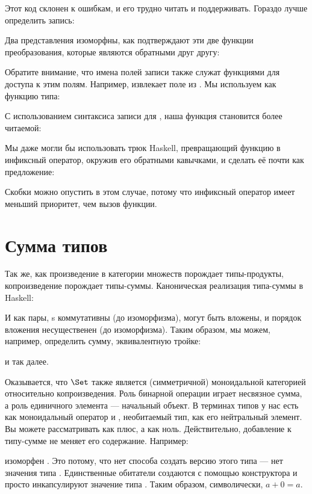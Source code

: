 Этот код склонен к ошибкам, и его трудно читать и поддерживать. Гораздо лучше определить запись:

Два представления изоморфны, как подтверждают эти две функции преобразования, которые являются обратными друг другу:


Обратите внимание, что имена полей записи также служат функциями для доступа к этим полям. Например,  извлекает поле  из . Мы используем  как функцию типа:

С использованием синтаксиса записи для , наша функция  становится более читаемой:

Мы даже могли бы использовать трюк Haskell, превращающий функцию  в инфиксный оператор, окружив его обратными кавычками, и сделать её почти как предложение:

Скобки можно опустить в этом случае, потому что инфиксный оператор имеет меньший приоритет, чем вызов функции.

\section{Сумма типов}

Так же, как произведение в категории множеств порождает типы-продукты, копроизведение порождает типы-суммы. Каноническая реализация типа-суммы в Haskell:

И как пары, s коммутативны (до изоморфизма), могут быть вложены, и порядок вложения несущественен (до изоморфизма). Таким образом, мы можем, например, определить сумму, эквивалентную тройке:

и так далее.

Оказывается, что $\Set$ также является (симметричной) моноидальной категорией относительно копроизведения. Роль бинарной операции играет несвязное сумма, а роль единичного элемента — начальный объект. В терминах типов у нас есть  как моноидальный оператор и , необитаемый тип, как его нейтральный элемент. Вы можете рассматривать  как плюс, а  как ноль. Действительно, добавление  к типу-сумме не меняет его содержание. Например:

изоморфен . Это потому, что нет способа создать версию  этого типа — нет значения типа . Единственные обитатели  создаются с помощью конструктора  и просто инкапсулируют значение типа . Таким образом, символически, $a + 0 = a$.

